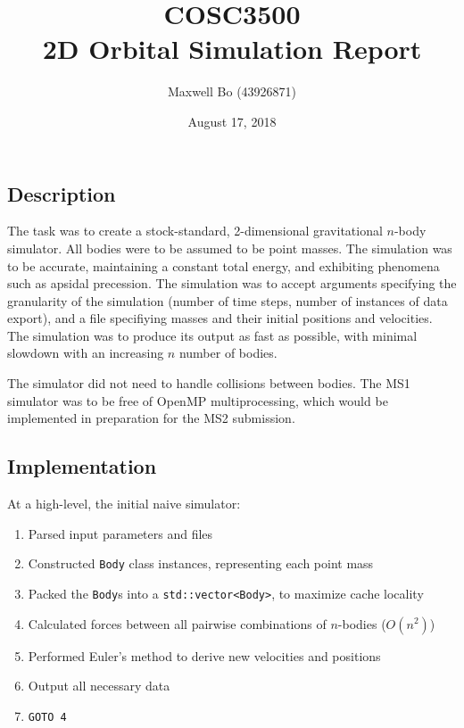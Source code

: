 \documentclass[11pt,a4paper]{article}
\begin{document}
\title{COSC3500 \\ 2D Orbital Simulation Report}
\author{Maxwell Bo (43926871)}
\date{August 17, 2018}
\maketitle

\subsection*{Description}
The task was to create a stock-standard, 2-dimensional gravitational $n$-body simulator. 
All bodies were to be assumed to be point masses. The simulation was to be accurate, maintaining a constant total energy, and exhibiting phenomena such as apsidal precession. 
The simulation was to accept arguments specifying the granularity of the simulation (number of time steps, number of instances of data export), and a file specifiying masses and their initial positions and velocities. 
The simulation was to produce its output as fast as possible, with minimal slowdown with an increasing $n$ number of bodies. 

The simulator did not need to handle collisions between bodies.
The MS1 simulator was to be free of OpenMP multiprocessing, which would be implemented in preparation for the MS2 submission.

\subsection*{Implementation}

At a high-level, the initial naive simulator:

\begin{enumerate}
    \item Parsed input parameters and files
    \item Constructed \texttt{Body} class instances, representing each point mass
    \item Packed the \texttt{Body}s into a \texttt{std::vector<Body>}, to maximize cache locality
    \item Calculated forces between all pairwise combinations of $n$-bodies ($O(n^2)$)
    \item Performed Euler's method to derive new velocities and positions
    \item Output all necessary data
    \item \texttt{GOTO 4}
\end{enumerate}
\end{document}
